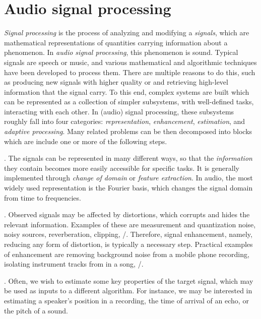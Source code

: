 \section{Audio signal processing}\label{sec:intro:processing}
\textit{Signal processing} is the process of analyzing and modifying a \textit{signals}, which are mathematical representations of quantities carrying information about a phenomenon.
In \textit{audio signal processing}, this phenomenon is sound.
Typical signals are speech or music, and various mathematical and algorithmic techniques have been developed to process them.
There are multiple reasons to do this, such as producing new signals with higher quality or and retrieving high-level information that the signal carry.
To this end, complex systems are built which can be represented as a collection of simpler subsystems, with well-defined tasks, interacting with each other.
In (audio) signal processing, these subsystems roughly fall into four categories: \textit{representation}, \textit{enhancement}, \textit{estimation}, and \textit{adaptive processing}.
Many related problems can be then decomposed into blocks which are include one or more of the following steps.

.
    The signals can be represented in many different ways, so that the \textit{information} they contain becomes more easily accessible for specific tasks.
    It is generally implemented through \textit{change of domain} or \textit{feature extraction}.
    In audio, the most widely used representation is the Fourier basis, which changes the signal domain from time to frequencies.

.
    Observed signals may be affected by distortions, which corrupts and hides the relevant information.
    Examples of these are measurement and quantization noise, noisy sources, reverberation, clipping, \etc/.
    Therefore, signal enhancement, namely, reducing any form of distortion, is typically a necessary step.
    Practical examples of enhancement are removing background noise from a mobile phone recording, isolating instrument tracks from in a song, \etc/.

.
    Often, we wish to estimate some key properties of the target signal, which may be used as inputs to a different algorithm.
    For instance, we may be interested in estimating a speaker's position in a recording, the time of arrival of an echo, or the pitch of a sound.

